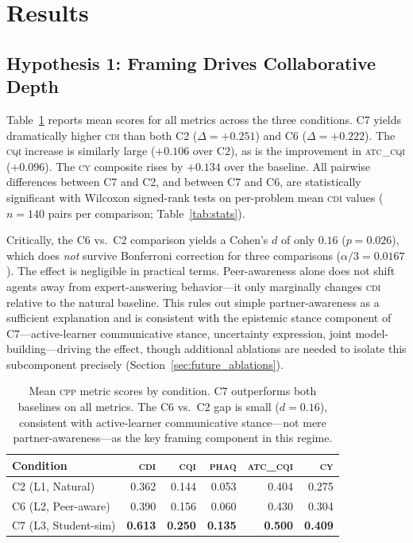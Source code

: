 \documentclass{article}
\newcommand{\CDI}{\textsc{cdi}}
\newcommand{\CQI}{\textsc{cqi}}
\newcommand{\PhAQ}{\textsc{phaq}}
\newcommand{\ATC}{\textsc{atc\_cqi}}
\newcommand{\CY}{\textsc{cy}}
\newcommand{\CPP}{\textsc{cpp}}
\begin{document}
\section{Results}
\label{sec:results}

\subsection{Hypothesis 1: Framing Drives Collaborative Depth}

Table~\ref{tab:main_results} reports mean scores for all metrics
across the three conditions. C7 yields dramatically higher \CDI{} than
both C2 ($\Delta = +0.251$) and C6 ($\Delta = +0.222$). The \CQI{}
increase is similarly large ($+0.106$ over C2), as is the improvement
in \ATC{} ($+0.096$). The \CY{} composite rises by $+0.134$ over the
baseline. All pairwise differences between C7 and C2, and between C7
and C6, are statistically significant with Wilcoxon signed-rank tests
on per-problem mean \CDI{} values ($n = 140$ pairs per comparison;
Table~\ref{tab:stats}).

Critically, the C6 vs.\ C2 comparison yields a Cohen's $d$ of only
$0.16$ ($p = 0.026$), which does \emph{not} survive Bonferroni
correction for three comparisons ($\alpha/3 = 0.0167$). The effect is
negligible in practical terms. Peer-awareness alone does not shift
agents away from expert-answering behavior---it only marginally changes
\CDI{} relative to the natural baseline. This rules out simple partner-awareness as a sufficient explanation
and is consistent with the epistemic stance component of C7---active-learner
communicative stance, uncertainty expression, joint model-building---driving
the effect, though additional ablations are needed to isolate this
subcomponent precisely (Section~\ref{sec:future_ablations}).

\begin{table}[t]
  \caption{Mean \CPP{} metric scores by condition. C7 outperforms both
  baselines on all metrics. The C6 vs.\ C2 gap is small ($d=0.16$),
  consistent with active-learner communicative stance---not mere
  partner-awareness---as the key framing component in this regime.}
  \label{tab:main_results}
  \centering
  \begin{tabular}{lrrrrr}
    \toprule
    \textbf{Condition} & \textbf{\CDI} & \textbf{\CQI} & \textbf{\PhAQ} & \textbf{\ATC} & \textbf{\CY} \\
    \midrule
    C2 (L1, Natural)   & 0.362 & 0.144 & 0.053 & 0.404 & 0.275 \\
    C6 (L2, Peer-aware) & 0.390 & 0.156 & 0.060 & 0.430 & 0.304 \\
    C7 (L3, Student-sim) & \textbf{0.613} & \textbf{0.250} & \textbf{0.135} & \textbf{0.500} & \textbf{0.409} \\
    \bottomrule
  \end{tabular}
\end{table}
\end{document}
